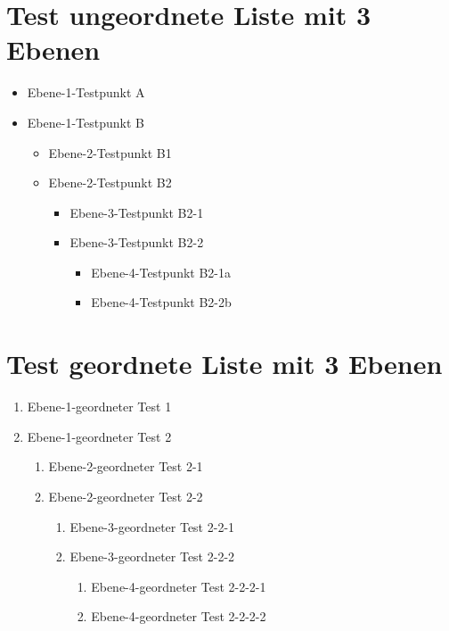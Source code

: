 \documentclass[de]{../../elegantbook}
\begin{document}
\section{Test ungeordnete Liste mit 3 Ebenen}
\begin{itemize}
\item Ebene-1-Testpunkt A
\item Ebene-1-Testpunkt B
    \begin{itemize}
    \item Ebene-2-Testpunkt B1
    \item Ebene-2-Testpunkt B2
        \begin{itemize}
        \item Ebene-3-Testpunkt B2-1
        \item Ebene-3-Testpunkt B2-2
            \begin{itemize}
            \item Ebene-4-Testpunkt B2-1a
            \item Ebene-4-Testpunkt B2-2b
            \end{itemize}
        \end{itemize}
    \end{itemize}
\end{itemize}

\section{Test geordnete Liste mit 3 Ebenen}
\begin{enumerate}
\item Ebene-1-geordneter Test 1
\item Ebene-1-geordneter Test 2
    \begin{enumerate}
    \item Ebene-2-geordneter Test 2-1
    \item Ebene-2-geordneter Test 2-2
        \begin{enumerate}
        \item Ebene-3-geordneter Test 2-2-1
        \item Ebene-3-geordneter Test 2-2-2
            \begin{enumerate}
            \item Ebene-4-geordneter Test 2-2-2-1
            \item Ebene-4-geordneter Test 2-2-2-2
            \end{enumerate}
        \end{enumerate}
    \end{enumerate}
\end{enumerate}
\end{document}
